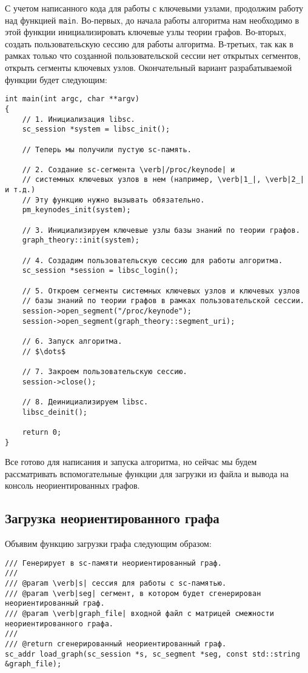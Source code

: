 С учетом написанного кода для работы с ключевыми узлами, продолжим
работу над функцией \lstinline|main|. Во-первых, до начала работы
алгоритма нам необходимо в этой функции инициализировать ключевые узлы
теории графов. Во-вторых, создать пользовательскую сессию для работы
алгоритма. В-третьих, так как в рамках только что созданной
пользовательской сессии нет открытых сегментов, открыть сегменты
ключевых узлов. Окончательный вариант разрабатываемой функции будет
следующим:
\begin{lstlisting}[texcl]
int main(int argc, char **argv)
{
    // 1. Инициализация libsc.
    sc_session *system = libsc_init();

    // Теперь мы получили пустую sc-память.

    // 2. Создание sc-сегмента \verb|/proc/keynode| и
    // системных ключевых узлов в нем (например, \verb|1_|, \verb|2_| и т.д.)
    // Эту функцию нужно вызывать обязательно.
    pm_keynodes_init(system);

    // 3. Инициализируем ключевые узлы базы знаний по теории графов.
    graph_theory::init(system);

    // 4. Создадим пользовательскую сессию для работы алгоритма.
    sc_session *session = libsc_login();

    // 5. Откроем сегменты системных ключевых узлов и ключевых узлов
    // базы знаний по теории графов в рамках пользовательской сессии.
    session->open_segment("/proc/keynode");
    session->open_segment(graph_theory::segment_uri);

    // 6. Запуск алгоритма.
    // $\dots$

    // 7. Закроем пользовательскую сессию.
    session->close();

    // 8. Деинициализируем libsc.
    libsc_deinit();

    return 0;
}
\end{lstlisting}

Все готово для написания и запуска алгоритма, но сейчас мы будем
рассматривать вспомогательные функции для загрузки из файла и вывода
на консоль неориентированных графов.

\subsection{Загрузка неориентированного графа}
\label{sec:libscprg_load_graph}

Объявим функцию загрузки графа следующим образом:
\begin{lstlisting}[texcl]
/// Генерирует в sc-памяти неориентированный граф.
///
/// @param \verb|s| сессия для работы с sc-памятью.
/// @param \verb|seg| сегмент, в котором будет сгенерирован неориентированный граф.
/// @param \verb|graph_file| входной файл с матрицей смежности неориентированного графа.
///
/// @return сгенерированный неориентированный граф.
sc_addr load_graph(sc_session *s, sc_segment *seg, const std::string &graph_file);
\end{lstlisting}

